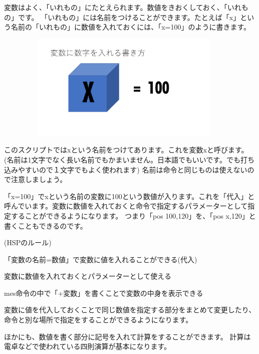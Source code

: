 変数はよく、「いれもの」にたとえられます。数値をきおくしておく、「いれもの」です。
「いれもの」には名前をつけることができます。たとえば「x」という名前の「いれもの」に数値を入れておくには、「x=100」のように書きます。

\begin{figure}[H]
    \begin{center}
        \includegraphics[keepaspectratio,width=10.478cm,height=5.106cm]{text02-img/text02-img045.png}
    \end{center}
\end{figure}

このスクリプトではxという名前をつけてあります。これを変数xと呼びます。(名前は1文字でなく長い名前でもかまいません。日本語でもいいです。でも打ち込みやすいので１文字でもよく使われます)
名前は命令と同じものは使えないので注意しましょう。

「x=100」でxという名前の変数に100という数値が入ります。これを「代入」と呼んでいます。変数に数値を入れておくと命令で指定するパラメーターとして指定することができるようになります。
つまり「pos 100,120」を、「pos x,120」と書くこともできるのです。

\begin{description}
    \item (HSPのルール)
\end{description}

\begin{description}
    \item 「変数の名前=数値」で変数に値を入れることができる(代入)
    \item 変数に数値を入れておくとパラメーターとして使える
    \item mes命令の中で「+変数」を書くことで変数の中身を表示できる
\end{description}

変数に値を代入しておくことで同じ数値を指定する部分をまとめて変更したり、命令と別な場所で指定をすることができるようになります。

ほかにも、数値を書く部分に記号を入れて計算をすることができます。
計算は電卓などで使われている四則演算が基本になります。

